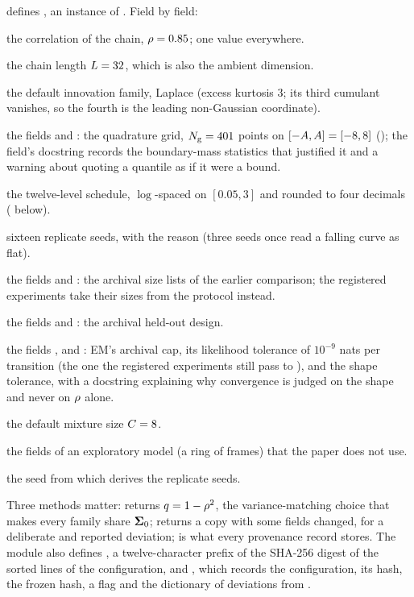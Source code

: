  defines , an instance of
. Field by field:
\begin{description}[leftmargin=2em,itemsep=0.2em]
\item[\code{rho}] the correlation of the chain, $\rho=0.85$; one value everywhere.
\item[\code{n\_sites}] the chain length $L=32$, which is also the ambient dimension.
\item[\code{innovation}] the default innovation family, Laplace (excess kurtosis $3$; its
  third cumulant vanishes, so the fourth is the leading non-Gaussian coordinate).
\item[grid] the fields  and : the quadrature grid, $N_{\mathrm{g}}=401$ points on
  $[-A,A]=[-8,8]$ (); the field's docstring
  records the boundary-mass statistics that justified it and a warning about quoting a
  quantile as if it were a bound.
\item[\code{t\_grid}] the twelve-level schedule, $\log$-spaced on $[0.05,3]$ and rounded to
  four decimals ( below).
\item[\code{n\_seeds}] sixteen replicate seeds, with the reason (three seeds once read a
  falling curve as flat).
\item[archival sizes] the fields  and : the archival size lists of the earlier
  comparison; the registered experiments take their sizes from the protocol instead.
\item[archival held-out] the fields  and : the archival held-out design.
\item[EM stopping] the fields ,  and : EM's archival
  cap, its likelihood tolerance of $10^{-9}$ nats per transition (the one the registered
  experiments still pass to ), and the shape tolerance, with a docstring
  explaining why convergence is judged on the shape and never on $\rho$ alone.
\item[\code{n\_components}] the default mixture size $C=8$.
\item[\code{ring\_*}] the fields of an exploratory model (a ring of frames) that the
  paper does not use.
\item[\code{base\_seed}] the seed from which  derives the replicate seeds.
\end{description}
Three methods matter:  returns $q=1-\rho^2$, the
variance-matching choice that makes every family share $\mathbf{\Sigma}_0$; 
returns a copy with some fields changed, for a deliberate and reported deviation;
 is what every provenance record stores. The module also defines
, a twelve-character prefix of the SHA-256 digest of the sorted
 lines of the configuration, and , which records
the configuration, its hash, the frozen hash, a flag  and the dictionary
of deviations from .

